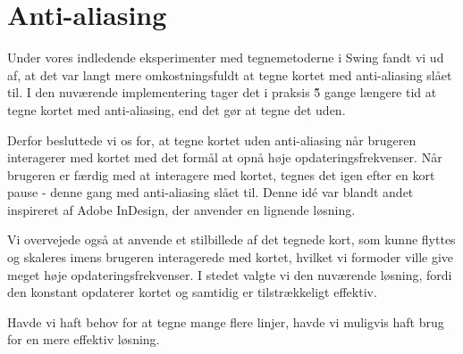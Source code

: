 \section{Anti-aliasing}

Under vores indledende eksperimenter med tegnemetoderne i Swing fandt vi ud af, at det var langt mere omkostningsfuldt at tegne kortet med anti-aliasing slået til. I den nuværende implementering tager det i praksis \~5 gange længere tid at tegne kortet med anti-aliasing, end det gør at tegne det uden.

Derfor besluttede vi os for, at tegne kortet uden anti-aliasing når brugeren interagerer med kortet med det formål at opnå høje opdateringsfrekvenser. Når brugeren er færdig med at interagere med kortet, tegnes det igen efter en kort pause - denne gang med anti-aliasing slået til. Denne idé var blandt andet inspireret af Adobe InDesign, der anvender en lignende løsning.

Vi overvejede også at anvende et stilbillede af det tegnede kort, som kunne flyttes og skaleres imens brugeren interagerede med kortet, hvilket vi formoder ville give meget høje opdateringsfrekvenser. I stedet valgte vi den nuværende løsning, fordi den konstant opdaterer kortet og samtidig er tilstrækkeligt effektiv.

Havde vi haft behov for at tegne mange flere linjer, havde vi muligvis haft brug for en mere effektiv løsning.
